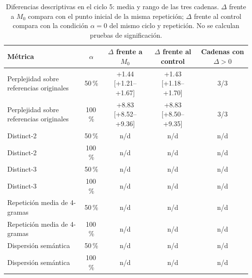 
\begin{table}[ht]
\centering
\footnotesize
\begin{tabular}{l c c c c}
\hline
Métrica & $\alpha$ & $\Delta$ frente a $M_0$ & $\Delta$ frente al control & Cadenas con $\Delta>0$ \\
\hline
Perplejidad sobre referencias originales & 50\,\% & +1.44 [+1.21--+1.67] & +1.43 [+1.18--+1.70] & 3/3 \\
Perplejidad sobre referencias originales & 100\,\% & +8.83 [+8.52--+9.36] & +8.83 [+8.50--+9.35] & 3/3 \\
\hline
Distinct-2 & 50\,\% & n/d & n/d & n/d \\
Distinct-2 & 100\,\% & n/d & n/d & n/d \\
\hline
Distinct-3 & 50\,\% & n/d & n/d & n/d \\
Distinct-3 & 100\,\% & n/d & n/d & n/d \\
\hline
Repetición media de 4-gramas & 50\,\% & n/d & n/d & n/d \\
Repetición media de 4-gramas & 100\,\% & n/d & n/d & n/d \\
\hline
Dispersión semántica & 50\,\% & n/d & n/d & n/d \\
Dispersión semántica & 100\,\% & n/d & n/d & n/d \\
\hline
\end{tabular}
\caption{Diferencias descriptivas en el ciclo 5: media y rango de las tres cadenas. $\Delta$ frente a $M_0$ compara con el punto inicial de la misma repetición; $\Delta$ frente al control compara con la condición $\alpha=0$ del mismo ciclo y repetición. No se calculan pruebas de significación.}
\label{tab:contrastes_ciclo5}
\end{table}

